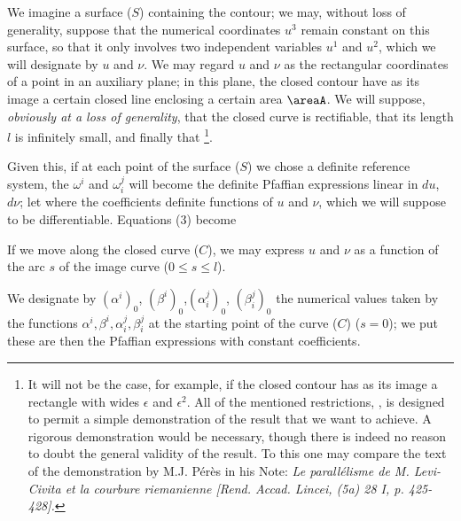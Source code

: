 We imagine a surface ($S$) containing the contour; we may, without loss of generality, suppose that the numerical coordinates $u^3$ remain constant on this surface, so that it only involves two independent variables $u^1$ and $u^2$, which we will designate by $u$ and $\nu$. We may regard $u$ and $\nu$ as the rectangular coordinates of a point in an auxiliary plane; in this plane, the closed contour have as its image a certain closed line enclosing a certain area $\areaA$. We will suppose, \textit{obviously at a loss of generality}, that the closed curve is rectifiable, that its length $l$ is infinitely small, and finally that \footnote{It will not be the case, for example, if the closed contour has as its image a rectangle with wides $\epsilon$ and $\epsilon^2$. All of the mentioned restrictions, , is designed to permit a simple demonstration of the result that we want to achieve. A rigorous demonstration would be necessary, though there is indeed no reason to doubt the general validity of the result. To this one may compare the text of the demonstration by M.J. Pérès in his Note: \textit{Le parallélisme de M. Levi-Civita et la courbure riemanienne [Rend. Accad. Lincei, (5a) 28 I, p. 425-428].}}.

Given this, if at each point of the surface ($S$) we chose a definite reference system, the $\omega^i$ and $\omega_i^j$ will become the definite Pfaffian expressions linear in $du$, $d\nu$; let
where the coefficients definite functions of $u$ and $\nu$, which we will suppose to be differentiable. Equations (3) become

If we move along the closed curve ($C$), we may express $u$ and $\nu$ as a function of the arc $s$ of the image curve ($0 \leq s \leq l$).

We designate by $(\alpha^i)_0$, $(\beta^i)_0$,$(\alpha_i^j)_0$, $(\beta_i^j)_0$ the numerical values taken by the functions $\alpha^i, \beta^i, \alpha_i^j, \beta_i^j$ at the starting point of the curve ($C$) ($s=0$); we put
these are then the Pfaffian expressions with constant coefficients.

